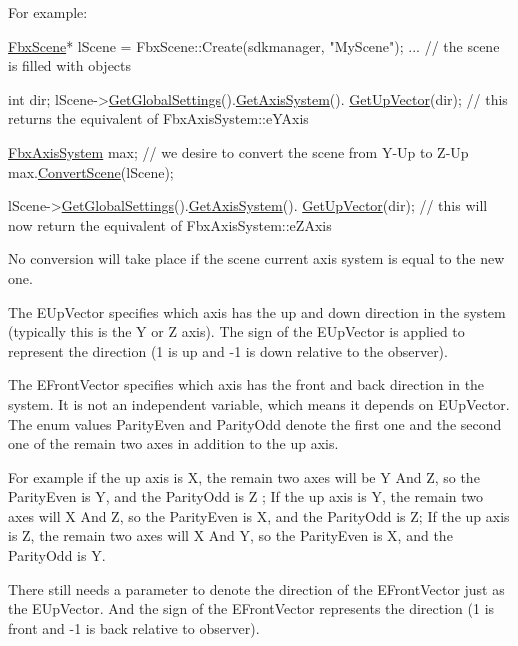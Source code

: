 For example\+: 
\begin{DoxyCode}
\hyperlink{class_fbx_scene}{FbxScene}* lScene = FbxScene::Create(sdkmanager, \textcolor{stringliteral}{"MyScene"});
...
\textcolor{comment}{// the scene is filled with objects}

int dir;
lScene->\hyperlink{class_fbx_scene_a0cb767181a743532c9e9be17f0348570}{GetGlobalSettings}().\hyperlink{class_fbx_global_settings_adf26f4742b088b497a5ecec8f458e47d}{GetAxisSystem}().
      \hyperlink{class_fbx_axis_system_a3ed72f373b701c5f7c108e93f23e0e73}{GetUpVector}(dir); \textcolor{comment}{// this returns the equivalent of FbxAxisSystem::eYAxis}

\hyperlink{class_fbx_axis_system}{FbxAxisSystem} max; \textcolor{comment}{// we desire to convert the scene from Y-Up to Z-Up}
max.\hyperlink{class_fbx_axis_system_abb9a361cd8d245c60e68b05868c67b4e}{ConvertScene}(lScene);

lScene->\hyperlink{class_fbx_scene_a0cb767181a743532c9e9be17f0348570}{GetGlobalSettings}().\hyperlink{class_fbx_global_settings_adf26f4742b088b497a5ecec8f458e47d}{GetAxisSystem}().
      \hyperlink{class_fbx_axis_system_a3ed72f373b701c5f7c108e93f23e0e73}{GetUpVector}(dir); \textcolor{comment}{// this will now return the equivalent of FbxAxisSystem::eZAxis}
\end{DoxyCode}


No conversion will take place if the scene current axis system is equal to the new one.

The E\+Up\+Vector specifies which axis has the up and down direction in the system (typically this is the Y or Z axis). The sign of the E\+Up\+Vector is applied to represent the direction (1 is up and -\/1 is down relative to the observer).

The E\+Front\+Vector specifies which axis has the front and back direction in the system. It is not an independent variable, which means it depends on E\+Up\+Vector. The enum values Parity\+Even and Parity\+Odd denote the first one and the second one of the remain two axes in addition to the up axis.

For example if the up axis is X, the remain two axes will be Y And Z, so the Parity\+Even is Y, and the Parity\+Odd is Z ; If the up axis is Y, the remain two axes will X And Z, so the Parity\+Even is X, and the Parity\+Odd is Z; If the up axis is Z, the remain two axes will X And Y, so the Parity\+Even is X, and the Parity\+Odd is Y.

There still needs a parameter to denote the direction of the E\+Front\+Vector just as the E\+Up\+Vector. And the sign of the E\+Front\+Vector represents the direction (1 is front and -\/1 is back relative to observer).

